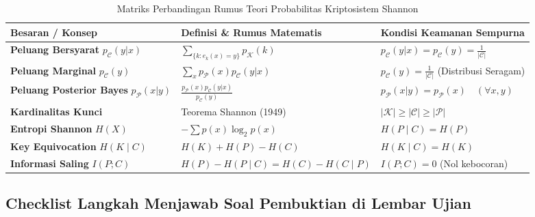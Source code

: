 \documentclass[11pt,a4paper]{article}
\begin{document}
\begin{table}[H]
\centering
\small
\renewcommand{\arraystretch}{1.4}
\begin{tabular}{p{4.5cm}p{5.5cm}p{5.2cm}}
\toprule
\textbf{Besaran / Konsep} & \textbf{Definisi \& Rumus Matematis} & \textbf{Kondisi Keamanan Sempurna} \\
\midrule
\textbf{Peluang Bersyarat} $p_{\mathcal{C}}(y|x)$ & $\sum_{\{k : e_k(x) = y\}} p_{\mathcal{K}}(k)$ & $p_{\mathcal{C}}(y|x) = p_{\mathcal{C}}(y) = \frac{1}{|\mathcal{C}|}$ \\
\textbf{Peluang Marginal} $p_{\mathcal{C}}(y)$ & $\sum_x p_{\mathcal{P}}(x) p_{\mathcal{C}}(y|x)$ & $p_{\mathcal{C}}(y) = \frac{1}{|\mathcal{C}|}$ (Distribusi Seragam) \\
\textbf{Peluang Posterior Bayes} $p_{\mathcal{P}}(x|y)$ & $\frac{p_{\mathcal{P}}(x) p_{\mathcal{C}}(y|x)}{p_{\mathcal{C}}(y)}$ & $p_{\mathcal{P}}(x|y) = p_{\mathcal{P}}(x) \quad (\forall x, y)$ \\
\textbf{Kardinalitas Kunci} & Teorema Shannon (1949) & $|\mathcal{K}| \ge |\mathcal{C}| \ge |\mathcal{P}|$ \\
\textbf{Entropi Shannon} $H(X)$ & $-\sum p(x) \log_2 p(x)$ & $H(P \mid C) = H(P)$ \\
\textbf{Key Equivocation} $H(K \mid C)$ & $H(K) + H(P) - H(C)$ & $H(K \mid C) = H(K)$ \\
\textbf{Informasi Saling} $I(P; C)$ & $H(P) - H(P \mid C) = H(C) - H(C \mid P)$ & $I(P; C) = 0$ (Nol kebocoran) \\
\bottomrule
\end{tabular}
\caption{Matriks Perbandingan Rumus Teori Probabilitas Kriptosistem Shannon}
\end{table}

\subsection{Checklist Langkah Menjawab Soal Pembuktian di Lembar Ujian}
\end{document}
